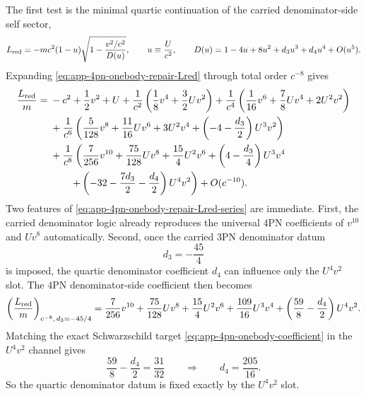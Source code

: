\documentclass[11pt]{article}
\begin{document}
The first test is the minimal quartic continuation of the carried
 denominator-side self sector,
\begin{equation}
L_{\rm red}
=-mc^2(1-u)\sqrt{1-\frac{v^2/c^2}{D(u)}},
\qquad
u\equiv\frac{U}{c^2},
\qquad
D(u)=1-4u+8u^2+d_3u^3+d_4u^4+O(u^5).
\label{eq:app-4pn-onebody-repair-Lred}
\end{equation}
Expanding \eqref{eq:app-4pn-onebody-repair-Lred} through total order $c^{-8}$
gives
\begin{align}
\frac{L_{\rm red}}{m}
={}&-c^2+\frac12v^2+U
+\frac{1}{c^2}\left(\frac18v^4+\frac32Uv^2\right)
+\frac{1}{c^4}\left(\frac1{16}v^6+\frac78Uv^4+2U^2v^2\right)
\nonumber\\
&
+\frac{1}{c^6}\left(
\frac5{128}v^8
+\frac{11}{16}Uv^6
+3U^2v^4
+\left(-4-\frac{d_3}{2}\right)U^3v^2
\right)
\nonumber\\
&
+\frac{1}{c^8}\left(
\frac7{256}v^{10}
+\frac{75}{128}Uv^8
+\frac{15}{4}U^2v^6
+\left(4-\frac{d_3}{4}\right)U^3v^4
\right.
\nonumber\\
&\left.\hspace{2em}
+\left(-32-\frac{7d_3}{2}-\frac{d_4}{2}\right)U^4v^2
\right)
+O(c^{-10}).
\label{eq:app-4pn-onebody-repair-Lred-series}
\end{align}
Two features of \eqref{eq:app-4pn-onebody-repair-Lred-series} are immediate.
First, the carried denominator logic already reproduces the universal $4$PN
coefficients of $v^{10}$ and $Uv^8$ automatically.  Second, once the carried
$3$PN denominator datum
\begin{equation}
\boxed{d_3=-\frac{45}{4}}
\label{eq:app-4pn-onebody-repair-d3-carried}
\end{equation}
is imposed, the quartic denominator coefficient $d_4$ can influence only the
$U^4v^2$ slot.  The $4$PN denominator-side coefficient then becomes
\begin{equation}
\left(\frac{L_{\rm red}}{m}\right)_{c^{-8},\,d_3=-45/4}
=
\frac7{256}v^{10}
+\frac{75}{128}Uv^8
+\frac{15}{4}U^2v^6
+\frac{109}{16}U^3v^4
+\left(\frac{59}{8}-\frac{d_4}{2}\right)U^4v^2.
\label{eq:app-4pn-onebody-repair-Lred-4pn}
\end{equation}
Matching the exact Schwarzschild target
\eqref{eq:app-4pn-onebody-coefficient} in the $U^4v^2$ channel gives
\begin{equation}
\frac{59}{8}-\frac{d_4}{2}=\frac{31}{32}
\qquad\Longrightarrow\qquad
\boxed{d_4=\frac{205}{16}.}
\label{eq:app-4pn-onebody-repair-d4}
\end{equation}
So the quartic denominator datum is fixed exactly by the $U^4v^2$ slot.
\end{document}
